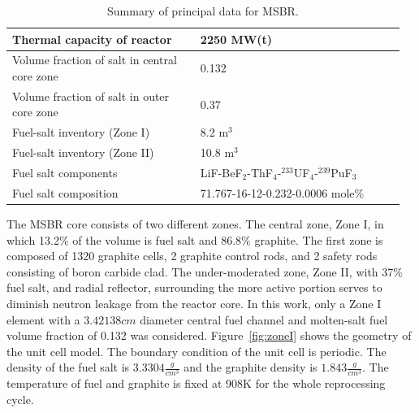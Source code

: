 \documentclass{anstrans}
\begin{document}
\captionsetup[table]{
        labelsep = newline,
        name = TABLE, justification=justified,
        singlelinecheck=false,%
        labelsep=colon,%
skip = \medskipamount}
\begin{table}[h!]
        \begin{tabular}{p{0.46\linewidth} p{0.50\linewidth}} \toprule
                Thermal capacity of reactor           & 2250 MW(t)
                \\ \midrule
                Volume fraction of salt in central core zone     & 0.132
                \\ \midrule
                Volume fraction of salt in outer core zone       & 0.37
                \\ \midrule
                Fuel-salt inventory (Zone I)                  & 8.2 m$^3$	
                \\ \midrule
                Fuel-salt inventory (Zone II)                 & 10.8 m$^3$	
                \\ \midrule
                Fuel salt components                  & 
                LiF-BeF$_2$-ThF$_4$-$^{233}$UF$_4$-$^{239}$PuF$_3$	\\ 
                \midrule
                Fuel salt composition                 & 
                71.767-16-12-0.232-0.0006 mole\%
                \\
                \bottomrule
        \end{tabular}
        \caption{Summary of principal data for MSBR.}
        \label{tab:data}
\end{table}

The \gls{MSBR} core consists of two different zones. The central 
zone, Zone I, in which 13.2\% of the volume is fuel salt and 86.8\% graphite. 
The first zone is composed of 1320 graphite cells, 2 graphite control rods, and 
2 safety rods consisting of boron carbide clad. The under-moderated zone, Zone 
II, with 37\% fuel salt, and radial reflector, surrounding the more active 
portion serves to diminish neutron leakage from the reactor core. In this work, 
only a Zone I element with a $3.42138 cm$ diameter central fuel channel and molten-salt 
fuel volume fraction of 0.132 was considered. Figure~\ref{fig:zoneI} shows the 
geometry of the unit cell model. The boundary condition of the unit cell is 
periodic. The density of the fuel salt is $3.3304 \frac{g}{cm^3}$ and the graphite density is 
$1.843 \frac{g}{cm^3}$. The temperature of fuel and graphite is fixed at 908K for the whole 
reprocessing cycle\cite{robertson_conceptual_1971}.
\end{document}
